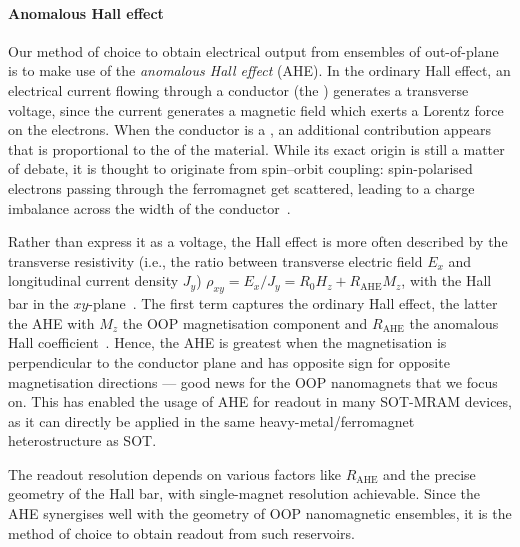 \paragraph{Anomalous Hall effect}
Our method of choice to obtain electrical output from ensembles of out-of-plane  is to make use of the \emph{anomalous Hall effect} (AHE).
In the ordinary Hall effect, an electrical current flowing through a conductor (the ) generates a transverse voltage, since the current generates a magnetic field which exerts a Lorentz force on the electrons.
When the conductor is a , an additional contribution appears that is proportional to the  of the material.
While its exact origin is still a matter of debate, it is thought to originate from spin--orbit coupling: spin-polarised electrons passing through the ferromagnet get scattered, leading to a charge imbalance across the width of the conductor~\cite{AHE_Culcer,AHE}. \par
Rather than express it as a voltage, the Hall effect is more often described by the transverse resistivity (i.e., the ratio between transverse electric field $E_x$ and longitudinal current density $J_y$) $\rho_{xy} = E_x/J_y = R_0 H_z + R_\mathrm{AHE} M_z$, with the Hall bar in the $xy$-plane~\cite{SHE,AHE}. %
The first term captures the ordinary Hall effect, the latter the AHE with $M_z$ the OOP magnetisation component and $R_\mathrm{AHE}$ the anomalous Hall coefficient~\cite{AHE}.
Hence, the AHE is greatest when the magnetisation is perpendicular to the conductor plane and has opposite sign for opposite magnetisation directions --- good news for the OOP nanomagnets that we focus on.
This has enabled the usage of AHE for readout in many SOT-MRAM devices, as it can directly be applied in the same heavy-metal/ferromagnet heterostructure as SOT. \par
The readout resolution depends on various factors like $R_\mathrm{AHE}$ and the precise geometry of the Hall bar, with single-magnet resolution achievable. %
Since the AHE synergises well with the geometry of OOP nanomagnetic ensembles, it is the method of choice to obtain readout from such reservoirs.

